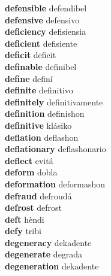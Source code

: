 \textbf{defensible } defendibel \\
\textbf{defensive } defensivo \\
\textbf{deficiency } defisiensia \\
\textbf{deficient } defisiente \\
\textbf{deficit } deficit \\
\textbf{definable } definibel \\
\textbf{define } definí \\
\textbf{definite } definitivo \\
\textbf{definitely } definitivamente \\
\textbf{definition } definishon \\
\textbf{definitive } klásiko \\
\textbf{deflation } deflashon \\
\textbf{deflationary } deflashonario \\
\textbf{deflect } evitá \\
\textbf{deform } dobla \\
\textbf{deformation } deformashon \\
\textbf{defraud } defroudá \\
\textbf{defrost } defrost \\
\textbf{deft } hèndi \\
\textbf{defy } tribi \\
\textbf{degeneracy } dekadente \\
\textbf{degenerate } degrada \\
\textbf{degeneration } dekadente \\
